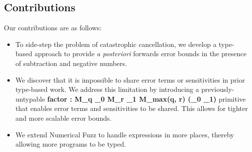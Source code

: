 
\subsection{Contributions}

Our contributions are as follows:
\begin{itemize}
  \item To side-step the problem of catastrophic cancellation, we develop a
    type-based approach to provide \textit{a posteriori} forwards error bounds
    in the presence of subtraction and negative numbers. 

  \item We discover that it is impossible to share error terms or sensitivities
    in prior type-based work. We address this limitation by introducing a
    previously-untypable \textbf{factor : M_q \tau_0 M_r \tau_1 \multimap
    M_{max(q, r)} (\tau_0 \times \tau_1)} primitive that enables error terms and
    sensitivities to be shared. This allows for tighter and more scalable error
    bounds.

  \item We extend Numerical Fuzz to handle expressions in more places, thereby
    allowing more programs to be typed.
\end{itemize}
